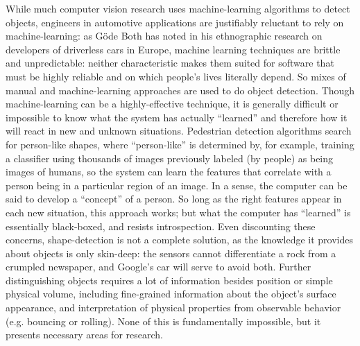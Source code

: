 
While much computer vision research uses machine-learning algorithms to detect
objects, engineers in automotive applications are justifiably
reluctant to rely on machine-learning: as Göde Both has noted in his
ethnographic research on developers of driverless cars in Europe,\cite{bothpt1}
machine learning techniques are brittle and unpredictable:\cite{bothpt2} neither
characteristic makes them suited for software that must be highly
reliable and on which people's lives literally depend. So mixes of
manual and machine-learning approaches are used to do object
detection. Though machine-learning can be a highly-effective
technique, it is generally difficult or impossible to know what the
system has actually ``learned'' and therefore how it will react in new
and unknown situations.\cite{bothpt2} Pedestrian detection algorithms search for
person-like shapes, where
``person-like'' is determined by, for example, training a classifier
using thousands of images previously labeled (by people) as being images of humans, so
the system can learn the features that correlate with a person being
in a particular region of an image. In a sense, the computer can be
said to develop
a ``concept'' of a person. So long as the right features appear in each
new situation, this approach works; but what the computer has
``learned'' is essentially black-boxed, and resists introspection.
Even discounting these concerns, shape-detection is not a complete
solution, as the knowledge it provides about objects is only
skin-deep: the sensors cannot differentiate a rock from a crumpled
newspaper, and Google's car will serve to avoid
both.\cite{gomesCircles} Further distinguishing objects requires a lot
of information besides position or simple physical volume,
including fine-grained information about the object's surface
appearance, and interpretation of physical properties from observable
behavior (e.g. bouncing or rolling). None of this is fundamentally
impossible, but it presents necessary areas for research.

